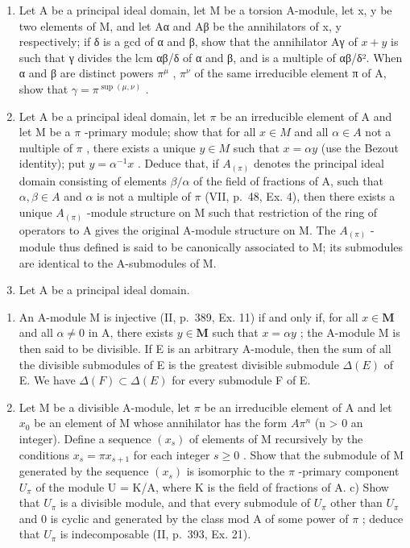 \BourbakiExerciseGroup

\begin{enumerate}
\def\labelenumi{\arabic{enumi})}
\item
  Let A be a principal ideal domain, let M be a torsion A-module, let x, y be two elements of M, and let Aα and Aβ be the annihilators of x, y respectively; if δ is a gcd of α and β, show that the annihilator Aγ of \(x + y\) is such that γ divides the lcm αβ/δ of α and β, and is a multiple of αβ/δ². When α and β are distinct powers \(\pi^{\mu}\) , \(\pi^{\nu}\) of the same irreducible element π of A, show that \(\gamma = \pi^{\sup(\mu, \nu)}\) .
\item
  Let A be a principal ideal domain, let \(\pi\) be an irreducible element of A and let M be a \(\pi\) -primary module; show that for all \(x \in M\) and all \(\alpha \in A\) not a multiple of \(\pi\) , there exists a unique \(y \in M\) such that \(x = \alpha y\) (use the Bezout identity); put \(y = \alpha^{-1}x\) . Deduce that, if \(A_{(\pi)}\) denotes the principal ideal domain consisting of elements \(\beta/\alpha\) of the field of fractions of A, such that \(\alpha, \beta \in A\) and \(\alpha\) is not a multiple of \(\pi\) (VII, p.~48, Ex. 4), then there exists a unique \(A_{(\pi)}\) -module structure on M such that restriction of the ring of operators to A gives the original A-module structure on M. The \(A_{(\pi)}\) -module thus defined is said to be canonically associated to M; its submodules are identical to the A-submodules of M.
\item
  Let A be a principal ideal domain.
\end{enumerate}

\begin{enumerate}
\def\labelenumi{\alph{enumi})}
\item
  An A-module M is injective (II, p.~389, Ex. 11) if and only if, for all \(x \in \mathbf{M}\) and all \(\alpha \neq 0\) in A, there exists \(y \in \mathbf{M}\) such that \(x = \alpha y\) ; the A-module M is then said to be divisible. If E is an arbitrary A-module, then the sum of all the divisible submodules of E is the greatest divisible submodule \(\Delta(E)\) of E. We have \(\Delta(F) \subset \Delta(E)\) for every submodule F of E.
\item
  Let M be a divisible A-module, let \(\pi\) be an irreducible element of A and let \(x_{0}\) be an element of M whose annihilator has the form \(A\pi^{n}\) (n \textgreater{} 0 an integer). Define a sequence \((x_{s})\) of elements of M recursively by the conditions \(x_{s} = \pi x_{s+1}\) for each integer \(s \geqslant 0\) . Show that the submodule of M generated by the sequence \((x_{s})\) is isomorphic to the \(\pi\) -primary component \(U_{\pi}\) of the module U = K/A, where K is the field of fractions of A. c) Show that \(U_{\pi}\) is a divisible module, and that every submodule of \(U_{\pi}\) other than \(U_{\pi}\) and 0 is cyclic and generated by the class mod A of some power of \(\pi\) ; deduce that \(U_{\pi}\) is indecomposable (II, p.~393, Ex. 21).
\end{enumerate}

